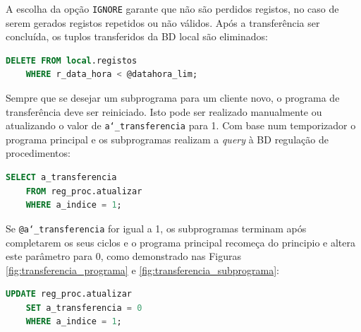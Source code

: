 \documentclass[11pt,twoside,a4paper]{report}
\begin{document}
A escolha da opção \texttt{IGNORE} garante que não são perdidos registos, no caso de serem gerados registos repetidos ou não válidos. Após a transferência ser concluída, os tuplos transferidos da BD local são eliminados:
\begin{lstlisting}[language = SQL]
	DELETE FROM local.registos
	WHERE r_data_hora < @datahora_lim;
\end{lstlisting}
Sempre que se desejar um subprograma para um cliente novo, o programa de transferência deve ser reiniciado. Isto pode ser realizado manualmente ou atualizando o valor de \texttt{a\char`_transferencia} para 1. Com base num temporizador o programa principal e os subprogramas realizam a \textit{query} à BD regulação de procedimentos:
\begin{lstlisting}[language = SQL]
	SELECT a_transferencia
	FROM reg_proc.atualizar
	WHERE a_indice = 1;
\end{lstlisting}
Se \texttt{@a\char`_transferencia} for igual a 1, os subprogramas terminam após completarem os seus ciclos e o programa principal recomeça do principio e altera este parâmetro para 0, como demonstrado nas Figuras \ref{fig:transferencia_programa} e \ref{fig:transferencia_subprograma}:
\begin{lstlisting}[language = SQL]
	UPDATE reg_proc.atualizar
	SET a_transferencia = 0
	WHERE a_indice = 1;
\end{lstlisting}
\end{document}
